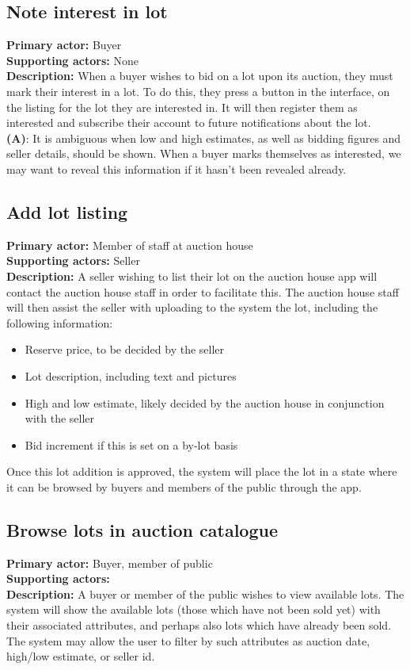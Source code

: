 \documentclass[titlepage, 12pt]{extarticle}
\begin{document}
\subsection{Note interest in lot}
{\bf Primary actor: } Buyer
\\{\bf Supporting actors: } None
\\{\bf Description: } When a buyer wishes to bid on a lot upon its auction, they must mark their interest in a lot. To do this, they press a button in the interface, on the listing for the lot they are interested in. It will then register them as interested and subscribe their account to future notifications about the lot.
\\{\bf (A)}: It is ambiguous when low and high estimates, as well as bidding figures and seller details, should be shown. When a buyer marks themselves as interested, we may want to reveal this information if it hasn't been revealed already.
\subsection{Add lot listing}
{\bf Primary actor: } Member of staff at auction house
\\{\bf Supporting actors: } Seller
\\{\bf Description: } A seller wishing to list their lot on the auction house app will contact the auction house staff in order to facilitate this. The auction house staff will then assist the seller with uploading to the system the lot, including the following information:
\begin{itemize}
\item Reserve price, to be decided by the seller
\item Lot description, including text and pictures
\item High and low estimate, likely decided by the auction house in conjunction with the seller
\item Bid increment if this is set on a by-lot basis
\end{itemize}

Once this lot addition is approved, the system will place the lot in a state where it can be browsed by buyers and members of the public through the app.

\subsection{Browse lots in auction catalogue}
{\bf Primary actor: } Buyer, member of public
\\{\bf Supporting actors: }
\\{\bf Description: } A buyer or member of the public wishes to view available lots. The system will show the available lots (those which have not been sold yet) with their associated attributes, and perhaps also lots which have already been sold. The system may allow the user to filter by such attributes as auction date, high/low estimate, or seller id. 
\end{document}
